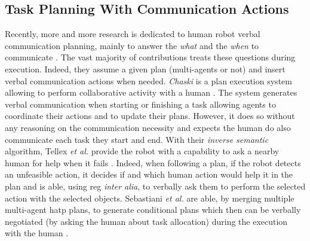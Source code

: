 \documentclass[a4paper,11pt,twoside]{StyleThese}
\begin{document}
\subsection{Task Planning With Communication Actions}

Recently, more and more research is dedicated to human robot verbal communication planning, mainly to answer the \textit{what} and the \textit{when} to communicate \cite{mavridis2015review}. The vast majority of contributions treats these questions during execution. Indeed, they assume a given plan (multi-agents or not) and insert verbal communication actions when needed.
\textit{Chaski} is a plan execution system allowing to perform collaborative activity with a human \cite{shah2011improved}. The system generates verbal communication when starting or finishing a task allowing agents to coordinate their actions and to update their plans. However, it does so without any reasoning on the communication necessity and expects the human do also communicate each task they start and end.
With their \textit{inverse semantic} algorithm, Tellex \textit{et al.} provide the robot with a capability to ask a nearby human for help when it fails \cite{tellex2014asking}. Indeed, when following a plan, if the robot detects an unfeasible action, it decides if and which human action would help it in the plan and is able, using \acrshort{reg} \textit{inter alia}, to verbally ask them to perform the selected action with the selected objects. 
Sebastiani \textit{et al.} are able, by merging multiple multi-agent \acrshort{hatp} plans, to generate conditional plans which then can be verbally negotiated (by asking the human about task allocation) during the execution with the human \cite{sebastiani2017dealing}. 
\end{document}

